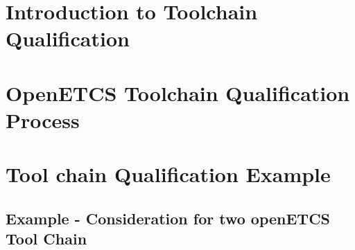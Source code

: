 \documentclass{template/openetcs_report}
\begin{document}
\chapter{Introduction to Toolchain Qualification}
\label{chap:introduction-and-sota}




\chapter{OpenETCS Toolchain Qualification Process}
\label{chap:qualification-process}


\chapter{Tool chain Qualification Example}
\section{Example - Consideration for two openETCS Tool Chain}





\end{document}
